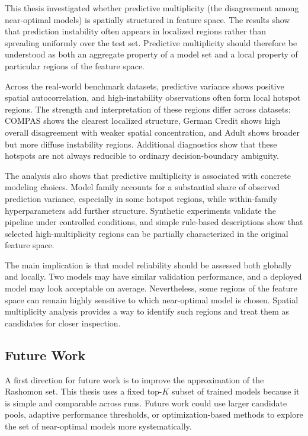 This thesis investigated whether predictive multiplicity (the disagreement among
near-optimal models) is spatially structured in feature space. The results show that
prediction instability often appears in localized regions rather than spreading uniformly
over the test set. Predictive multiplicity should therefore be understood as both an
aggregate property of a model set and a local property of particular regions of
the feature space.

Across the real-world benchmark datasets, predictive variance shows positive spatial
autocorrelation, and high-instability observations often form local hotspot regions. The
strength and interpretation of these regions differ across datasets: COMPAS shows the
clearest localized structure, German Credit shows high overall disagreement with weaker
spatial concentration, and Adult shows broader but more diffuse instability regions.
Additional diagnostics show that these hotspots are not always reducible to ordinary
decision-boundary ambiguity.

The analysis also shows that predictive multiplicity is associated with concrete modeling
choices. Model family accounts for a substantial share of observed prediction variance,
especially in some hotspot regions, while within-family hyperparameters add further
structure. Synthetic experiments validate the pipeline under controlled conditions, and
simple rule-based descriptions show that selected high-multiplicity regions can be
partially characterized in the original feature space.

The main implication is that model reliability should be assessed both globally and locally.
Two models may have similar validation performance, and a deployed model may look
acceptable on average. Nevertheless, some regions of the feature space can remain highly
sensitive to which near-optimal model is chosen. Spatial multiplicity analysis provides a way to
identify such regions and treat them as candidates for closer inspection.

\subsection{Future Work}

A first direction for future work is to improve the approximation of the Rashomon set.
This thesis uses a fixed top-$K$ subset of trained models because it is simple and
comparable across runs. Future work could use larger candidate pools, adaptive
performance thresholds, or optimization-based methods to explore the set of
near-optimal models more systematically.

